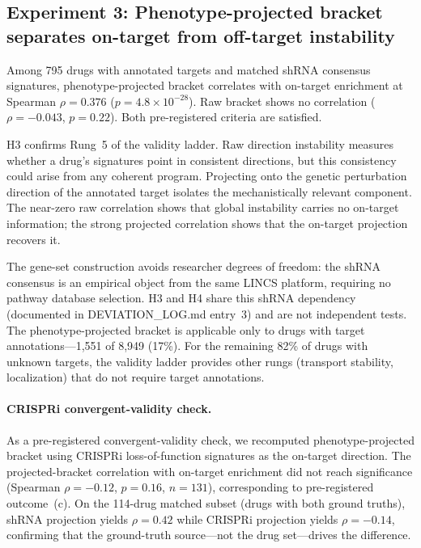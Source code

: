 \documentclass{article}
\begin{document}
\subsection{Experiment 3: Phenotype-projected bracket separates on-target from off-target instability}

Among 795 drugs with annotated targets and matched shRNA consensus signatures,
phenotype-projected bracket correlates with on-target enrichment at Spearman
$\rho = 0.376$ ($p = 4.8 \times 10^{-28}$). Raw bracket shows no correlation
($\rho = -0.043$, $p = 0.22$). Both pre-registered criteria are satisfied.

H3 confirms Rung~5 of the validity ladder. Raw direction instability
measures whether a drug's signatures point in consistent directions, but
this consistency could arise from any coherent program. Projecting onto the
genetic perturbation direction of the annotated target isolates the
mechanistically relevant component. The near-zero raw correlation shows
that global instability carries no on-target information; the strong
projected correlation shows that the on-target projection recovers it.

The gene-set construction avoids researcher degrees of freedom: the shRNA
consensus is an empirical object from the same LINCS platform,
requiring no pathway database selection. H3 and H4 share this shRNA
dependency (documented in DEVIATION\_LOG.md entry~3) and are not
independent tests. The phenotype-projected bracket is applicable only
to drugs with target annotations---1{,}551 of 8{,}949 (17\%). For the
remaining 82\% of drugs with unknown targets, the validity ladder
provides other rungs (transport stability, localization) that do not
require target annotations.

\paragraph{CRISPRi convergent-validity check.}
As a pre-registered convergent-validity check, we recomputed
phenotype-projected bracket using CRISPRi loss-of-function signatures
\citep{replogle2022mapping} as the on-target
direction. The projected-bracket correlation with on-target enrichment
did not reach significance (Spearman $\rho = -0.12$, $p = 0.16$,
$n = 131$), corresponding to pre-registered outcome~(c). On the
114-drug matched subset (drugs with both ground truths), shRNA
projection yields $\rho = 0.42$ while CRISPRi projection yields
$\rho = -0.14$, confirming that the ground-truth source---not the
drug set---drives the difference.
\end{document}
